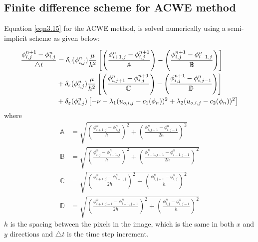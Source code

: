 \documentclass[10pt,letterpaper, onecolumn]{article}
\begin{document}
\begin{appendices}
\section{Finite difference scheme for ACWE method}
\label{Appendix-A}
Equation \eqref{eqn3.15} for the ACWE method,  is solved numerically using a semi-implicit scheme as given below:

\begin{align}
\frac{\phi_{i,j}^{n+1} - \phi_{i,j}^{n} }{\triangle t} &= 
\delta_\varepsilon (\phi_{i,j}^{n}) \frac{\mu}{h^2} 
\left[ \left( \frac{\phi_{i+1,j}^{n} - \phi_{i,j}^{n+1}}
{\mathbb{A}} \right) 
- \left( \frac{\phi_{i,j}^{n+1} - \phi_{i-1,j}^{n}}
{\mathbb{B} } \right) \right]  \notag \\
&+
\delta_\varepsilon (\phi_{i,j}^{n}) \frac{\mu}{h^2} 
\left[ \left( \frac{\phi_{i,j+1}^{n} - \phi_{i,j}^{n+1}}
{\mathbb{C}}  \right)
- \left( \frac{\phi_{i,j}^{n+1} - \phi_{i,j-1}^{n}}
{\mathbb{D} } \right) \right] \notag \\
&+
\delta_\varepsilon (\phi_{i,j}^{n})
\left[ -\nu -\lambda_1 (u_{o,i,j} - c_1(\phi_n))^2 +  \lambda_2 (u_{o,i,j} - c_2(\phi_n))^2 \right]
\end{align}
where
%
%
\begin{subequations}
\begin{align}
\mathbb{A} &= \sqrt{ \left(  \frac{\phi_{i+1,j}^{n} - \phi_{i,j}^{n}}{h} \right)^2 
       + \left( \frac{\phi_{i,j+1}^{n} - \phi_{i,j-1}^{n}}{2h}  \right)^2 } \\
\mathbb{B} &= \sqrt{ \left(  \frac{\phi_{i,j}^{n} - \phi_{i-1,j}^{n}}{h} \right)^2 
       + \left( \frac{\phi_{i-1,j+1}^{n} - \phi_{i-1,j-1}^{n}}{2h}  \right)^2 } \\
\mathbb{C} &= \sqrt{ \left(  \frac{\phi_{i+1,j}^{n} - \phi_{i-1,j}^{n}}{2h} \right)^2 
       + \left( \frac{\phi_{i,j+1}^{n} - \phi_{i,j}^{n}}{h}  \right)^2 } \\
\mathbb{D} &= \sqrt{ \left(  \frac{\phi_{i+1,j-1}^{n} - \phi_{i-1,j-1}^{n}}{2h} \right)^2 
       + \left( \frac{\phi_{i,j}^{n} - \phi_{i,j-1}^{n}}{h}  \right)^2 }
\end{align}
\end{subequations}
%
$h$ is the spacing between the pixels in the image, which is the same in both $x$ and $y$ directions and 
$\triangle t$ is the time step increment.

\end{appendices}







 
\end{document}
